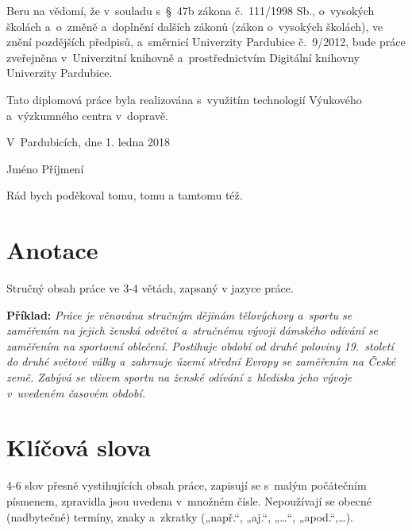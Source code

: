 \documentclass[12pt,a4paper]{report}															%
\begin{document}
Beru na vědomí, že v~souladu s~§~47b zákona č.~111/1998 Sb., o~vysokých školách a~o~změně a~doplnění dalších zákonů (zákon o~vysokých školách), ve znění pozdějších předpisů, a~směrnicí Univerzity Pardubice č.~9/2012, bude práce zveřejněna v~Univerzitní knihovně a~prostřednictvím Digitální knihovny Univerzity Pardubice.

Tato diplomová práce byla realizována s~využitím technologií Výukového a~výzkumného centra v~dopravě.

\vspace*{84pt}
V~Pardubicích, dne 1. ledna 2018																%

\vspace*{84pt}
\hspace*{300pt}																					%
Jméno Příjmení

\thispagestyle{empty}
\newpage


Rád bych poděkoval tomu, tomu a tamtomu též.													%
\thispagestyle{empty}
\newpage


\section*{Anotace}
Stručný obsah práce ve 3-4 větách, zapsaný v jazyce práce.										%

\textbf{Příklad:} \textit{Práce je věnována stručným dějinám tělovýchovy a~sportu se zaměřením na jejich ženská odvětví a~stručnému vývoji dámského odívání se zaměřením na sportovní oblečení. Postihuje období od druhé poloviny 19.~století do druhé světové války a~zahrnuje území střední Evropy se zaměřením na České země. Zabývá se vlivem sportu na ženské odívání z~hlediska jeho vývoje v~uvedeném časovém období.}

\section*{Klíčová slova}
4-6 slov přesně vystihujících obsah práce, zapisují se s~malým počátečním písmenem, zpravidla jsou uvedena v~množném čísle. Nepoužívají se obecné (nadbytečné) termíny, znaky a~zkratky („např.“, „aj.“, „…“, „apod.“,…).										%
\end{document}
